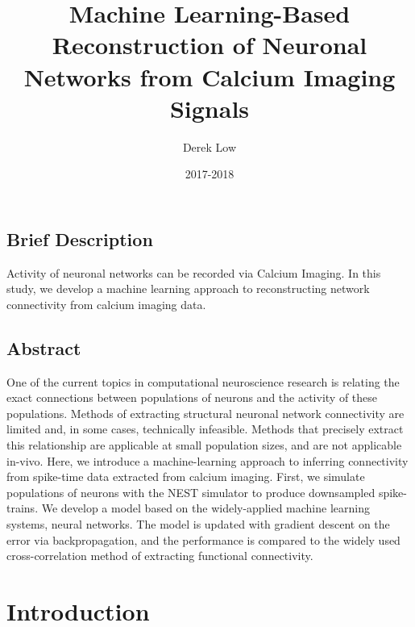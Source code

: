 \documentclass[11pt]{article}
\title{Machine Learning-Based Reconstruction of Neuronal Networks from Calcium Imaging Signals}
\author{Derek Low}
\date{2017-2018}
\begin{document}
\maketitle

\subsection{Brief Description}
Activity of neuronal networks can be recorded via Calcium Imaging. In this study, we develop a machine learning approach to reconstructing network connectivity from calcium imaging data.

\subsection{Abstract}
One of the current topics in computational neuroscience research is relating the exact connections between populations of neurons and the activity of these populations. Methods of extracting structural neuronal network connectivity are limited and, in some cases, technically infeasible. Methods that precisely extract this relationship are applicable at small population sizes, and are not applicable in-vivo. Here, we introduce a machine-learning approach to inferring connectivity from spike-time data extracted from calcium imaging. First, we simulate populations of neurons with the NEST simulator to produce downsampled spike-trains. We develop a model based on the widely-applied machine learning systems, neural networks. The model is updated with gradient descent on the error via backpropagation, and the performance is compared to the widely used cross-correlation method of extracting functional connectivity.

\section{Introduction}
\end{document}
